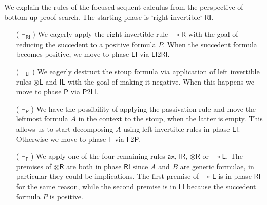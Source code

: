 \documentclass[submission,copyright,creativecommons]{eptcs}
\theoremstyle{definition}
\newcommand{\tl}{\otimes \mathsf{L}}
\newcommand{\tr}{\otimes \mathsf{R}}
\newcommand{\lright}{{\multimap}\mathsf{R}}
\newcommand{\lleft}{{\multimap}\mathsf{L}}
\newcommand{\pass}{\mathsf{pass}}
\newcommand{\unitl}{\mathsf{IL}}
\newcommand{\unitr}{\mathsf{IR}}
\newcommand{\ax}{\mathsf{ax}}
\newcommand{\RI}{\mathsf{RI}}
\newcommand{\LI}{\mathsf{LI}}
\newcommand{\Pass}{\mathsf{P}}
\newcommand{\F}{\mathsf{F}}
\begin{document}
We explain the rules of the focused sequent calculus from the perspective of bottom-up proof search. The starting phase is `right invertible` $\RI$. %
\begin{itemize}
\item[($\vdash_\RI$)] We eagerly apply the right invertible rule $\lright$ with the goal of reducing the succedent to a positive formula $P$.
  When the succedent formula becomes positive, we move to phase $\LI$ via $\LI2\RI$.
\item[($\vdash_\LI$)] We eagerly destruct the stoup formula via application of left invertible rules $\tl$ and $\unitl$ with the goal of making it negative. When this happens we move to phase $\Pass$ via $\Pass2\LI$.
\item[($\vdash_\Pass$)] We have the possibility of applying the passivation rule and move the leftmost formula $A$ in the context to the stoup, when the latter is empty. This allows us to start decomposing $A$ using left invertible rules in phase $\LI$. Otherwise we move to phase $\F$ via $\F2\Pass$.
\item[($\vdash_\F$)] We apply one of the four remaining rules $\ax$, $\unitr$, $\tr$ or $\lleft$. The premises of $\tr$ are both in phase $\RI$ since $A$ and $B$ are generic formulae, in particular they could be implications. The first premise of $\lleft$ is in phase $\RI$ for the same reason, while the second premise is in $\LI$ because the succedent formula $P$ is positive.
\end{itemize}
\end{document}

